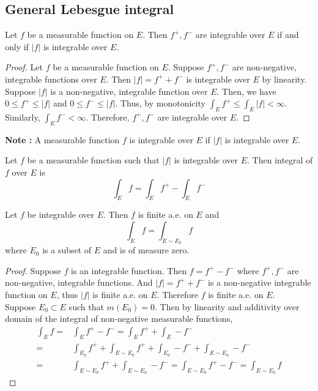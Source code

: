 \subsection{General Lebesgue integral}
\begin{theorem}
	Let $f$ be a measurable function on $E$.
	Then $f^+,f^-$ are integrable over $E$ if and only if $|f|$ is integrable over $E$.
\end{theorem}
\begin{proof}
	Let $f$ be a measurable function on $E$.
	Suppose $f^+,f^-$ are non-negative, integrable functions over $E$.
	Then $|f| = f^+ + f^-$ is integrable over $E$ by linearity.\\

	Suppose $|f|$ is a non-negative, integrable function over $E$.
	Then, we have $0 \le f^+ \le |f|$ and $0 \le f^- \le |f|$.
	Thus, by monotonicity $\displaystyle \int_E f^+ \le \int_E |f| < \infty$.
	Similarly, $\displaystyle \int_E f^- < \infty$.
	Therefore, $f^+,f^-$ are integrable over $E$.
\end{proof}

\textbf{Note : } A measurable function $f$ is integrable over $E$ if $|f|$ is integrable over $E$.
\begin{definition}
	Let $f$ be a measurable function such that $|f|$ is integrable over $E$.
	Then integral of $f$ over $E$ is
	\begin{equation}
		\int_E f = \int_E f^+ - \int_E f^-
	\end{equation}
\end{definition}

\begin{theorem}
	Let $f$ be integrable over $E$.
	Then $f$ is finite a.e. on $E$ and
	\begin{equation}
		\int_E f = \int_{E \sim E_0} f
	\end{equation}
	where $E_0$ is a subset of $E$ and is of measure zero.
\end{theorem}
\begin{proof}
	Suppose $f$ is an integrable function.
	Then $f = f^+ - f^-$ where $f^+,f^-$ are non-negative, integrable functions.
	And $|f| = f^+ + f^-$ is a non-negative integrable function on $E$, thus $|f|$ is finite a.e. on $E$.
	Therefore $f$ is finite a.e. on $E$.\\

	Suppose $E_0 \subset E$ such that $m(E_0) = 0$.
	Then by linearity and additivity over domain of the integral of non-negative measurable functions,
	\begin{align*}
		\int_E f = & \int_E f^+ - f^- = \int_E f^+ + \int_E -f^- \\
		= & \int_{E_0} f^+ + \int_{E \sim E_0} f^+ + \int_{E_0} -f^- + \int_{E \sim E_0} -f^- \\
		= & \int_{E \sim E_0} f^+ + \int_{E \sim E_0} -f^- = \int_{E \sim E_0} f^+ - f^- = \int_{E \sim E_0} f
	\end{align*}
\end{proof}

